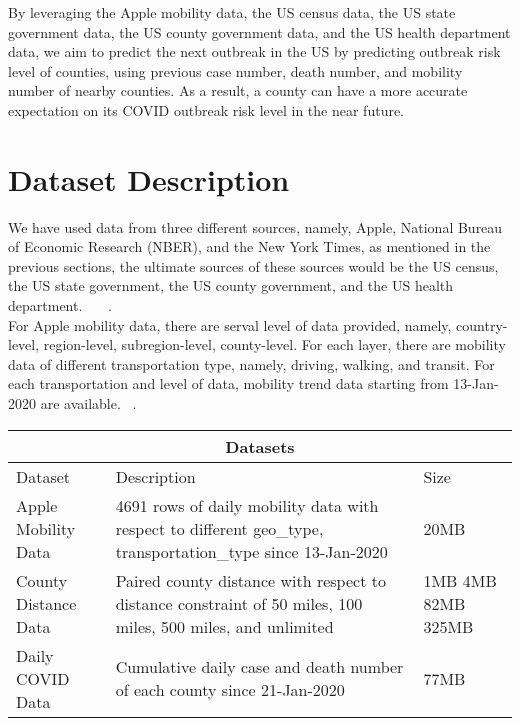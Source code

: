 By leveraging the Apple mobility data, the US census data, the US state government data, the US county government data, and the US health department data, we aim to predict the next outbreak in the US by predicting outbreak risk level of counties, using previous case number, death number, and mobility number of nearby counties. As a result, a county can have a more accurate expectation on its COVID outbreak risk level in the near future. 

\section{Dataset Description}
We have used data from three different sources, namely, Apple, National Bureau of Economic Research (NBER), and the New York Times, as mentioned in the previous sections, the ultimate sources of these sources would be the US census, the US state government, the US county government, and the US health department. ~\cite{applemobility}~\cite{nytimes}~\cite{nber}.\\

For Apple mobility data, there are serval level of data provided, namely, country-level, region-level, subregion-level, county-level. For each layer, there are mobility data of different transportation type, namely, driving, walking, and transit. For each transportation and level of data, mobility trend data starting from 13-Jan-2020 are available.  ~\cite{applemobility}.\\

\begin{tabular}{ |p{1.5cm}||p{4cm}|p{1.3cm}|  }
 \hline
 \multicolumn{3}{|c|}{Datasets} \\
 \hline
 Dataset    & Description & Size\\
 \hline
 Apple Mobility Data & 
    4691 rows of daily mobility data with respect to different geo\_type, transportation\_type since 13-Jan-2020
 & 20MB\\
 \hline
 County Distance Data &   
    Paired county distance with respect to distance constraint of 50 miles, 100 miles, 500 miles, and unlimited 
   & 
    1MB
    4MB
    82MB
    325MB 
 \\
 \hline
 Daily COVID Data  &
 Cumulative daily case and death number of each county since 21-Jan-2020
 & 77MB\\
 \hline
\end{tabular}\\

